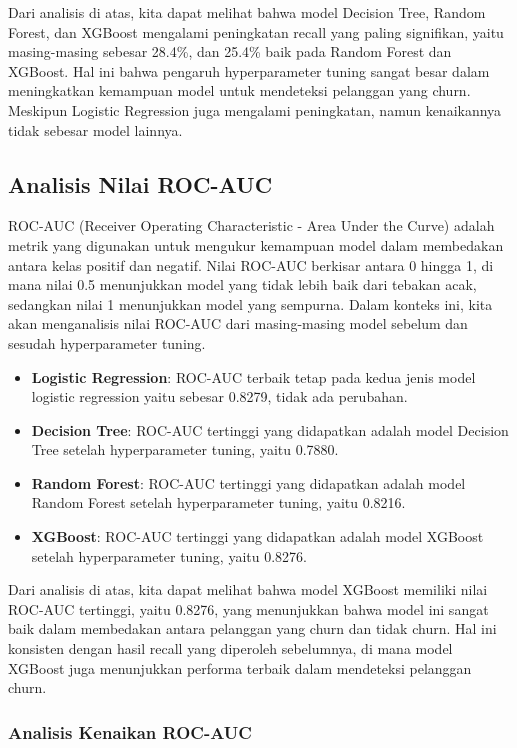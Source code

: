 Dari analisis di atas, kita dapat melihat bahwa model Decision Tree, Random Forest, dan XGBoost mengalami peningkatan recall yang paling signifikan, yaitu masing-masing sebesar 28.4\%, dan 25.4\% baik pada Random Forest dan XGBoost. Hal ini bahwa pengaruh hyperparameter tuning sangat besar dalam meningkatkan kemampuan model untuk mendeteksi pelanggan yang churn. Meskipun Logistic Regression juga mengalami peningkatan, namun kenaikannya tidak sebesar model lainnya.

\subsection{Analisis Nilai ROC-AUC}
ROC-AUC (Receiver Operating Characteristic - Area Under the Curve) adalah metrik yang digunakan untuk mengukur kemampuan model dalam membedakan antara kelas positif dan negatif. Nilai ROC-AUC berkisar antara 0 hingga 1, di mana nilai 0.5 menunjukkan model yang tidak lebih baik dari tebakan acak, sedangkan nilai 1 menunjukkan model yang sempurna. Dalam konteks ini, kita akan menganalisis nilai ROC-AUC dari masing-masing model sebelum dan sesudah hyperparameter tuning.
\begin{itemize}
    \item \textbf{Logistic Regression}: ROC-AUC terbaik tetap pada kedua jenis model logistic regression yaitu sebesar 0.8279, tidak ada perubahan.
    \item \textbf{Decision Tree}: ROC-AUC tertinggi yang didapatkan adalah model Decision Tree setelah hyperparameter tuning, yaitu 0.7880.
    \item \textbf{Random Forest}: ROC-AUC tertinggi yang didapatkan adalah model Random Forest setelah hyperparameter tuning, yaitu 0.8216.
    \item \textbf{XGBoost}: ROC-AUC tertinggi yang didapatkan adalah model XGBoost setelah hyperparameter tuning, yaitu 0.8276.
\end{itemize}
Dari analisis di atas, kita dapat melihat bahwa model XGBoost memiliki nilai ROC-AUC tertinggi, yaitu 0.8276, yang menunjukkan bahwa model ini sangat baik dalam membedakan antara pelanggan yang churn dan tidak churn. Hal ini konsisten dengan hasil recall yang diperoleh sebelumnya, di mana model XGBoost juga menunjukkan performa terbaik dalam mendeteksi pelanggan churn.

\subsubsection{Analisis Kenaikan ROC-AUC}

